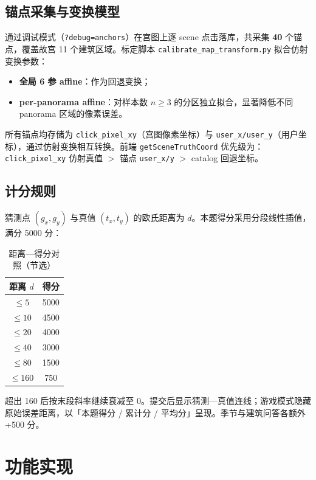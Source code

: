 \documentclass[UTF8,a4paper,12pt]{ctexart}
\begin{document}
\subsection{锚点采集与变换模型}
通过调试模式（\texttt{?debug=anchors}）在宫图上逐 scene 点击落库，共采集 \textbf{40} 个锚点，覆盖故宫 11 个建筑区域。标定脚本 \texttt{calibrate\_map\_transform.py} 拟合仿射变换参数：
\begin{itemize}[nosep]
  \item \textbf{全局 6 参 affine}：作为回退变换；
  \item \textbf{per-panorama affine}：对样本数 $n\ge 3$ 的分区独立拟合，显著降低不同 panorama 区域的像素误差。
\end{itemize}
所有锚点均存储为 \texttt{click\_pixel\_xy}（宫图像素坐标）与 \texttt{user\_x/user\_y}（用户坐标），通过仿射变换相互转换。前端 \texttt{getSceneTruthCoord} 优先级为：\texttt{click\_pixel\_xy} 仿射真值 $>$ 锚点 \texttt{user\_x/y} $>$ catalog 回退坐标。

\subsection{计分规则}
猜测点 $(g_x,g_y)$ 与真值 $(t_x,t_y)$ 的欧氏距离为 $d$。本题得分采用分段线性插值，满分 5000 分：
\begin{table}[htbp]
  \centering
  \caption{距离—得分对照（节选）}
  \label{tab:score}
  \begin{tabular}{@{}cc@{}}
    \toprule
    距离 $d$ & 得分 \\
    \midrule
    $\le 5$ & 5000 \\
    $\le 10$ & 4500 \\
    $\le 20$ & 4000 \\
    $\le 40$ & 3000 \\
    $\le 80$ & 1500 \\
    $\le 160$ & 750 \\
    \bottomrule
  \end{tabular}
\end{table}
超出 160 后按末段斜率继续衰减至 0。提交后显示猜测—真值连线；游戏模式隐藏原始误差距离，以「本题得分 / 累计分 / 平均分」呈现。季节与建筑问答各额外 +500 分。
\section{功能实现}
\end{document}
